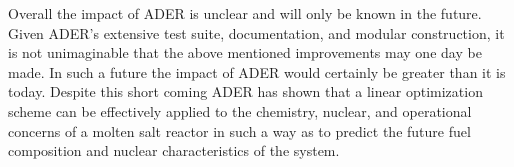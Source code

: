 Overall the impact of ADER is unclear and will only be known in the future.
Given ADER's extensive test suite, documentation, and modular construction, it
is not unimaginable that the above mentioned improvements may one day be made.
In such a future the impact of ADER would certainly be greater than it is today.
Despite this short coming ADER has shown that a linear optimization scheme can
be effectively applied to the chemistry, nuclear, and operational concerns of a
molten salt reactor in such a way as to predict the future fuel composition and 
nuclear characteristics of the system.
